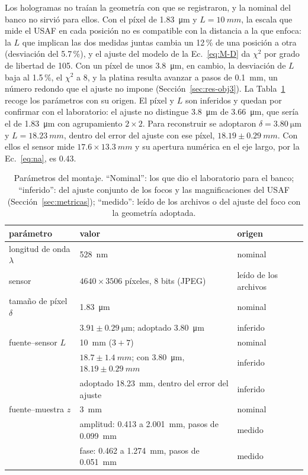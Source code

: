 Los hologramas no traían la geometría con que se registraron, y la nominal
del banco no sirvió para ellos. Con el píxel de \SI{1.83}{\micro\metre} y
$L = \SI{10}{mm}$, la escala que mide el USAF en cada posición no es compatible
con la distancia a la que enfoca: la $L$ que implican las dos medidas juntas
cambia un 12\,\% de una posición a otra (desviación del 5.7\,\%), y el ajuste
del modelo de la Ec.~\eqref{eq:M-D} da $\chi^2$ por grado de libertad de 105.
Con un píxel de unos \SI{3.8}{\micro\metre}, en cambio, la desviación de $L$
baja al 1.5\,\%, el $\chi^2$ a 8, y la platina resulta avanzar a pasos de
\SI{0.1}{mm}, un número redondo que el ajuste no impone
(Sección~\ref{sec:res-obj3}). La Tabla~\ref{tab:montaje} recoge los
parámetros con su origen. El píxel y $L$ son inferidos y quedan por confirmar
con el laboratorio: el ajuste no distingue \SI{3.8}{\micro\metre} de
\SI{3.66}{\micro\metre}, que sería el de \SI{1.83}{\micro\metre} con
agrupamiento $2\times2$. Para reconstruir se adoptaron
$\delta = \SI{3.80}{\micro\metre}$ y $L = \SI{18.23}{mm}$, dentro del error
del ajuste con ese píxel, $18.19\pm\SI{0.29}{mm}$. Con ellos el sensor
mide $17.6\times\SI{13.3}{mm}$ y su apertura numérica en el eje largo, por la
Ec.~\eqref{eq:na}, es 0.43.

\begin{table}[htbp]
  \centering
  \small
  \caption[Parámetros del montaje y de los hologramas experimentales]{Parámetros
  del montaje. ``Nominal'': los que dio el laboratorio para el banco;
  ``inferido'': del ajuste conjunto de los focos y las magnificaciones del USAF
  (Sección~\ref{sec:metricas}); ``medido'': leído de los archivos o del ajuste
  del foco con la geometría adoptada.}
  \label{tab:montaje}
  \begin{tabular}{lll}
    \toprule
    parámetro & valor & origen \\
    \midrule
    longitud de onda $\lambda$ & \SI{528}{nm} & nominal \\
    sensor & $4640\times3506$ píxeles, 8 bits (JPEG) & leído de los archivos \\
    tamaño de píxel $\delta$ & \SI{1.83}{\micro\metre} & nominal \\
     & $3.91\pm\SI{0.29}{\micro\metre}$; adoptado \SI{3.80}{\micro\metre} & inferido \\
    fuente--sensor $L$ & \SI{10}{mm} ($3 + 7$) & nominal \\
     & $18.7\pm\SI{1.4}{mm}$; con \SI{3.80}{\micro\metre}, $18.19\pm\SI{0.29}{mm}$ & inferido \\
     & adoptado \SI{18.23}{mm}, dentro del error del ajuste & inferido \\
    fuente--muestra $z$ & \SI{3}{mm} & nominal \\
     & amplitud: 0.413 a \SI{2.001}{mm}, pasos de \SI{0.099}{mm} & medido \\
     & fase: 0.462 a \SI{1.274}{mm}, pasos de \SI{0.051}{mm} & medido \\
    \bottomrule
  \end{tabular}
\end{table}

